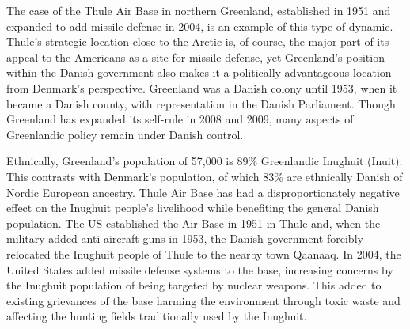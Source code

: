 The case of the Thule Air Base in northern Greenland, established in 1951 and expanded to add missile defense in 2004, is an example of this type of dynamic. Thule's strategic location close to the Arctic is, of course, the major part of its appeal to the Americans as a site for missile defense, yet Greenland's position within the Danish government also makes it a politically advantageous location from Denmark's perspective. Greenland was a Danish colony until 1953, when it became a Danish county, with representation in the Danish Parliament. Though Greenland has expanded its self-rule in 2008 and 2009, many aspects of Greenlandic policy remain under Danish control.\cite{Dragsdahl2005} 

Ethnically, Greenland's population of 57,000 is 89\% Greenlandic Inughuit (Inuit). This contrasts with Denmark's population, of which 83\% are ethnically Danish of Nordic European ancestry. Thule Air Base has had a disproportionately negative effect on the Inughuit people's livelihood while benefiting the general Danish population. The US established the Air Base in 1951 in Thule and, when the military added anti-aircraft guns in 1953, the Danish government forcibly relocated the Inughuit people of Thule to the nearby town Qaanaaq.\cite{Spiermann2004} In 2004, the United States added missile defense systems to the base, increasing concerns by the Inughuit population of being targeted by nuclear weapons. This added to existing grievances of the base harming the environment through toxic waste and affecting the hunting fields traditionally used by the Inughuit.\cite{Dragsdahl2005}


